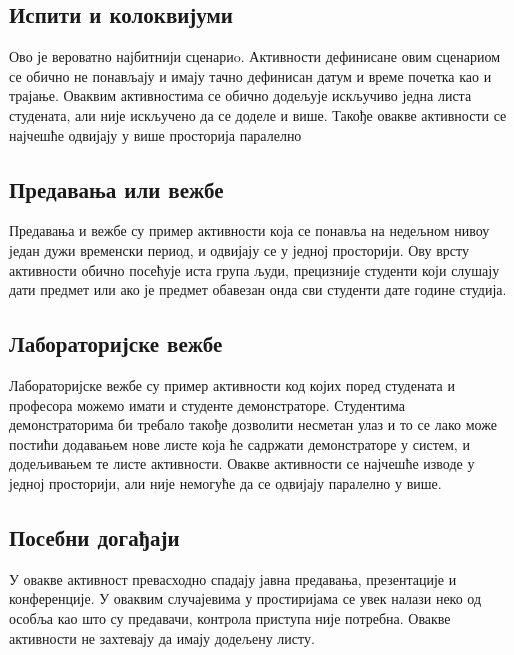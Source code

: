 \documentclass[a4paper, 12pt, diplomski]{etfcyr}
\begin{document}
        \subsection[Сценарио 1]{Испити и колоквијуми}
            \begin{justify}
                Ово је вероватно најбитнији сценариo. Активности дефинисане овим сценариом се обично не понављају и имају тачно дефинисан датум и време почетка као и трајање. Оваквим активностима се обично додељује искључиво једна листа студената, али није искључено да се доделе и више. Такође овакве активности се најчешће одвијају у више просторија паралелно
            \end{justify}
        
        \subsection[Сценарио 2]{Предавања или вежбе}
            \begin{justify}
                Предавања и вежбе су пример активности која се понавља на недељном нивоу један дужи временски период, и одвијају се у једној просторији. Ову врсту активности обично посећује иста група људи, прецизније студенти који слушају дати предмет или ако је предмет обавезан онда сви студенти дате године студија.
            \end{justify}
        
        \subsection[Сценарио 3]{Лабораторијске вежбе}
            \begin{justify}
                Лабораторијске вежбе су пример активности код којих поред студената и професора можемо имати и студенте демонстраторе. Студентима демонстраторима би требало такође дозволити несметан улаз и то се лако може постићи додавањем нове листе која ће садржати демонстраторе у систем, и додељивањем те листе активности. Овакве активности се најчешће изводе у једној просторији, али није немогуће да се одвијају паралелно у више.
            \end{justify}
        
        \subsection[Сценарио 4]{Посебни догађаји}
            \begin{justify}
                У овакве активност превасходно спадају јавна предавања, презентације и конференције. У оваквим случајевима у простиријама се увек налази неко од особља као што су предавачи, контрола приступа није потребна. Овакве активности не захтевају да имају додељену листу.
            \end{justify}
        
\end{document}
